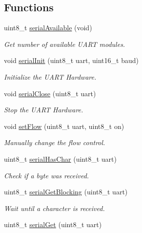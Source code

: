 \subsection*{Functions}
\begin{DoxyCompactItemize}
\item 
uint8\-\_\-t \hyperlink{group__uart_ga1ea963b291215ad9c5e8a0610f116b90}{serial\-Available} (void)
\begin{DoxyCompactList}\small\item\em Get number of available U\-A\-R\-T modules. \end{DoxyCompactList}\item 
void \hyperlink{group__uart_ga73d4335cb201753c580c87954f493886}{serial\-Init} (uint8\-\_\-t uart, uint16\-\_\-t baud)
\begin{DoxyCompactList}\small\item\em Initialize the U\-A\-R\-T Hardware. \end{DoxyCompactList}\item 
void \hyperlink{group__uart_gaa16a5ecaf9e40660ded50737ff1d0a88}{serial\-Close} (uint8\-\_\-t uart)
\begin{DoxyCompactList}\small\item\em Stop the U\-A\-R\-T Hardware. \end{DoxyCompactList}\item 
void \hyperlink{group__uart_ga5d5de9e3ed5a0be11f707113cfff33f5}{set\-Flow} (uint8\-\_\-t uart, uint8\-\_\-t on)
\begin{DoxyCompactList}\small\item\em Manually change the flow control. \end{DoxyCompactList}\item 
uint8\-\_\-t \hyperlink{group__uart_ga266a54dcf3c4b85d92bf6b16bdcb5069}{serial\-Has\-Char} (uint8\-\_\-t uart)
\begin{DoxyCompactList}\small\item\em Check if a byte was received. \end{DoxyCompactList}\item 
uint8\-\_\-t \hyperlink{group__uart_gaf7c4238a9a5e8fff64af1faf1689a5a4}{serial\-Get\-Blocking} (uint8\-\_\-t uart)
\begin{DoxyCompactList}\small\item\em Wait until a character is received. \end{DoxyCompactList}\item 
uint8\-\_\-t \hyperlink{group__uart_gaa9d6e44600b215154c3f66193df151f6}{serial\-Get} (uint8\-\_\-t uart)

\end{DoxyCompactItemize}
